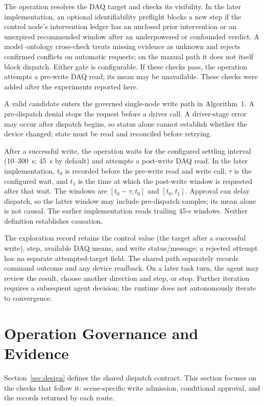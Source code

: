 \documentclass[journal]{IEEEtran}
\begin{document}
The operation resolves the DAQ target and checks its visibility. In the later implementation, an optional identifiability preflight blocks a new step if the control node's intervention ledger has an unclosed prior intervention or an unexpired recommended window after an underpowered or confounded verdict. A model--ontology cross-check treats missing evidence as unknown and rejects confirmed conflicts on automatic requests; on the manual path it does not itself block dispatch. Either gate is configurable. If these checks pass, the operation attempts a pre-write DAQ read; its mean may be unavailable. These checks were added after the experiments reported here.

A valid candidate enters the governed single-node write path in Algorithm~1. A pre-dispatch denial stops the request before a driver call. A driver-stage error may occur after dispatch begins, so status alone cannot establish whether the device changed; state must be read and reconciled before retrying.

After a successful write, the operation waits for the configured settling interval (10--300~s; 45~s by default) and attempts a post-write DAQ read. In the later implementation, $t_0$ is recorded before the pre-write read and write call, $\tau$ is the configured wait, and $t_1$ is the time at which the post-write window is requested after that wait. The windows are $[t_0-\tau,t_0]$ and $[t_0,t_1]$. Approval can delay dispatch, so the latter window may include pre-dispatch samples; its mean alone is not causal. The earlier implementation reads trailing 45-s windows. Neither definition establishes causation.

The exploration record retains the control value (the target after a successful write), step, available DAQ means, and write status/message; a rejected attempt has no separate attempted-target field. The shared path separately records command outcome and any device readback. On a later task turn, the agent may review the result, choose another direction and step, or stop. Further iteration requires a subsequent agent decision; the runtime does not autonomously iterate to convergence.


 \section{Operation Governance and Evidence}
\label{sec:modules}
Section~\ref{sec:design} defines the shared dispatch contract. This section
focuses on the checks that follow it: scene-specific write admission,
conditional approval, and the records returned by each route.
\end{document}
